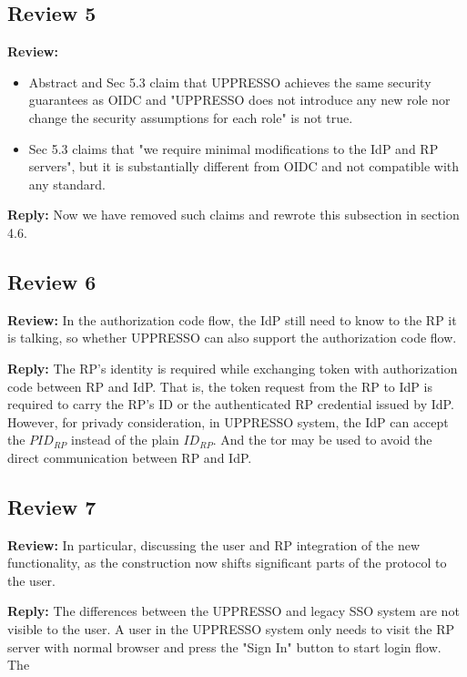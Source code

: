 \documentclass[letterpaper,onecolumn,10pt]{article}
\begin{document}
\subsection*{Review 5}
\vspace{1mm}\noindent\textbf{Review:}
\begin{itemize}
\item Abstract and Sec 5.3 claim that UPPRESSO achieves the same security guarantees as OIDC and "UPPRESSO does not introduce any new role nor change the security assumptions for each role" is not true.
 \item Sec 5.3 claims that "we require minimal modifications to the IdP and RP servers", but it is substantially different from OIDC and not compatible with any standard.

\end{itemize}


\vspace{1mm}\noindent\textbf{Reply:}
Now we have removed such claims and rewrote this subsection in section 4.6.

\subsection*{Review 6}
\vspace{1mm}\noindent\textbf{Review:}
In the authorization code flow, the IdP still need to know to the RP it is talking, so whether UPPRESSO can also support the authorization code flow.

\vspace{1mm}\noindent\textbf{Reply:}
The RP's identity is required while exchanging token with authorization code between RP and IdP.
That is, the token request from the RP to IdP is required to carry the RP's ID or the authenticated RP credential issued by IdP.
However, for privady consideration, in UPPRESSO system, the IdP can accept the $PID_{RP}$ instead of the plain $ID_{RP}$.
And the tor may be used to avoid the direct communication between RP and IdP.


\subsection*{Review 7}
\vspace{1mm}\noindent\textbf{Review:}
In particular, discussing the user and RP integration of the new functionality, as the construction now shifts significant parts of the protocol to the user.

\vspace{1mm}\noindent\textbf{Reply:}
The differences between the UPPRESSO and legacy SSO system are not visible to the user. 
A user in the UPPRESSO system only needs to visit the RP server with normal browser and press the "Sign In" button to start login flow.  
The 
\end{document}
